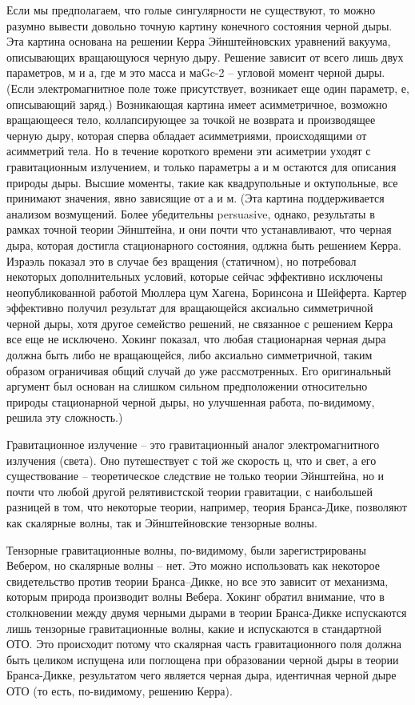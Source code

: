 \documentclass[a4paper, 10pt, twocolumn]{article}
\def\q#1{{\color{red} #1}}
\begin{document}
Если мы предполагаем, что голые сингулярности не существуют, то можно 
разумно вывести довольно точную картину конечного состояния черной дыры. 
Эта картина основана на решении Керра Эйнштейновских уравнений вакуума, 
описывающих вращающуюся черную дыру. Решение зависит от всего лишь двух 
параметров, м и а, где м это масса и маGc-2 -- угловой момент черной 
дыры. (Если электромагнитное поле тоже присутствует, возникает еще один 
параметр, е, описывающий заряд.) Возникающая картина имеет 
асимметричное, возможно вращающееся тело, коллапсирующее за точкой не 
возврата и производящее черную дыру, которая сперва обладает 
асимметриями, происходящими от асимметрий тела. Но в течение короткого 
времени эти асиметрии уходят с гравитационным излучением, и только 
параметры а и м остаются для описания природы дыры. Высшие моменты, 
такие как квадрупольные и октупольные, все принимают значения, явно 
зависящие от а и м. (Эта картина поддерживается анализом возмущений. 
Более убедительны \q{persuasive}, однако, результаты в рамках точной 
теории Эйнштейна, и они почти что устанавливают, что черная дыра, 
которая достигла стационарного состояния, одлжна быть решением Керра. 
Израэль показал это в случае без вращения (статичном), но потребовал 
некоторых дополнительных условий, которые сейчас эффективно исключены 
неопубликованной работой Мюллера цум Хагена, Боринсона и Шейферта. 
Картер эффективно получил результат для вращающейся аксиально 
симметричной черной дыры, хотя другое семейство решений, не связанное 
с решением Керра все еще не исключено. Хокинг показал, что любая 
стационарная черная дыра должна быть либо не вращающейся, либо аксиально 
симметричной, таким образом ограничивая общий случай до уже 
рассмотренных. Его оригинальный аргумент был основан на слишком сильном 
предположении относительно природы стационарной черной дыры, но 
улучшенная работа, по-видимому, решила эту сложность.)

Гравитационное излучение -- это гравитационный аналог электромагнитного 
излучения (света). Оно путешествует с той же скорость ц, что и свет, 
а его существование -- теоретическое следствие не только теории 
Эйнштейна, но и почти что любой другой релятивистской теории гравитации, 
с наибольшей разницей в том, что некоторые теории, например, теория 
Бранса-Дике, позволяют как скалярные волны, так и Эйнштейновские 
тензорные волны.

Тензорные гравитационные волны, по-видимому, были зарегистрированы 
Вебером, но скалярные волны -- нет. Это можно использовать как некоторое 
свидетельство против теории Бранса--Дикке, но все это зависит от 
механизма, которым природа производит волны Вебера. Хокинг обратил 
внимание, что в столкновении между двумя черными дырами в теории 
Бранса-Дикке испускаются лишь тензорные гравитационные волны, какие 
и испускаются в стандартной ОТО. Это происходит потому что скалярная 
часть гравитационного поля должна быть целиком испущена или поглощена 
при образовании черной дыры в теории Бранса-Дикке, результатом чего 
является черная дыра, идентичная черной дыре ОТО (то есть, по-видимому, 
решению Керра).
\end{document}
